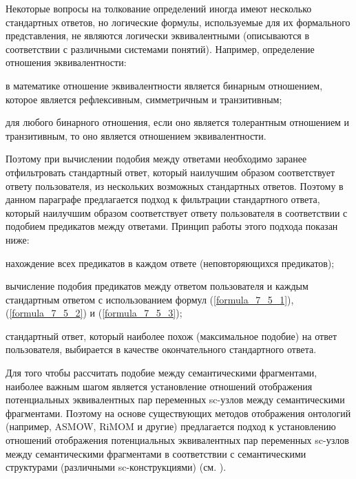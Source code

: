 Некоторые вопросы на толкование определений иногда имеют несколько стандартных ответов, но логические формулы, используемые для их формального представления, не являются логически эквивалентными (описываются в соответствии с различными системами понятий). Например, определение отношения эквивалентности:

\begin{textitemize}
	\item в математике отношение эквивалентности является бинарным отношением, которое является рефлексивным, симметричным и транзитивным;
	\item для любого бинарного отношения, если оно является толерантным отношением и транзитивным, то оно является отношением эквивалентности.
\end{textitemize}

Поэтому при вычислении подобия между ответами необходимо заранее отфильтровать стандартный ответ, который наилучшим образом соответствует ответу пользователя, из нескольких возможных стандартных ответов. Поэтому в данном параграфе предлагается подход к фильтрации стандартного ответа, который наилучшим образом соответствует ответу пользователя в соответствии с подобием предикатов между ответами. Принцип работы этого подхода показан ниже:

\begin{textitemize}
	\item нахождение всех предикатов в каждом ответе (неповторяющихся предикатов);
	\item вычисление подобия предикатов между ответом пользователя и каждым стандартным ответом с использованием формул (\ref{formula_7_5_1}), (\ref{formula_7_5_2}) и (\ref{formula_7_5_3}); 
	\item стандартный ответ, который наиболее похож (максимальное подобие) на ответ пользователя, выбирается в качестве окончательного стандартного ответа.
\end{textitemize}

Для того чтобы рассчитать подобие между семантическими фрагментами, наиболее важным шагом является установление отношений отображения потенциальных эквивалентных пар переменных sc-узлов между семантическими фрагментами. Поэтому на основе существующих методов отображения онтологий (например, ASMOW, RiMOM и другие) предлагается подход к установлению отношений отображения потенциальных эквивалентных пар переменных sc-узлов между семантическими фрагментами в соответствии с семантическими структурами (различными sc-конструкциями) (см. ).

